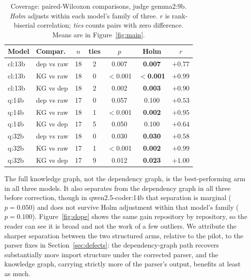 \documentclass[conference]{IEEEtran}
\begin{document}
\begin{table}[htbp]
\caption{Coverage: paired-Wilcoxon comparisons, judge gemma2:9b. \emph{Holm} adjusts within each
model's family of three. $r$ is rank-biserial correlation; \emph{ties} counts pairs with zero
difference. Means are in Figure~\ref{fig:main}.}
\label{tab:coverage}
\centering
\footnotesize
\begin{tabular}{@{}p{0.85cm}p{1.25cm}ccccc@{}}
\toprule
Model & Compar. & $n$ & ties & $p$ & Holm & $r$ \\
\midrule
cl:13b & dep vs raw & 18 & 2 & 0.007 & \textbf{0.007} & $+0.77$ \\
cl:13b & KG vs raw & 18 & 0 & $<$0.001 & \textbf{$<$0.001} & $+0.99$ \\
cl:13b & KG vs dep & 18 & 2 & 0.002 & \textbf{0.003} & $+0.90$ \\
q:14b & dep vs raw & 17 & 0 & 0.057 & 0.100 & $+0.53$ \\
q:14b & KG vs raw & 18 & 1 & $<$0.001 & \textbf{0.002} & $+0.95$ \\
q:14b & KG vs dep & 17 & 5 & 0.050 & 0.100 & $+0.64$ \\
q:32b & dep vs raw & 18 & 0 & 0.030 & \textbf{0.030} & $+0.58$ \\
q:32b & KG vs raw & 17 & 1 & $<$0.001 & \textbf{0.002} & $+0.99$ \\
q:32b & KG vs dep & 17 & 9 & 0.012 & \textbf{0.023} & $+1.00$ \\
\bottomrule
\end{tabular}
\end{table}

The full knowledge graph, not the dependency graph, is the best-performing arm in all three
models. It also separates from the dependency graph in all three before correction, though in
qwen2.5-coder:14b that separation is marginal ($p=0.050$) and does not survive Holm adjustment
within that model's family ($p=0.100$). Figure~\ref{fig:slope} shows the same gain repository by
repository, so the reader can see it is broad and not the work of a few outliers. We attribute
the sharper separation between the two structured arms, relative to the pilot, to the parser
fixes in Section~\ref{sec:defects}: the dependency-graph path recovers substantially more import
structure under the corrected parser, and the knowledge graph, carrying strictly more of the
parser's output, benefits at least as much.
\end{document}
